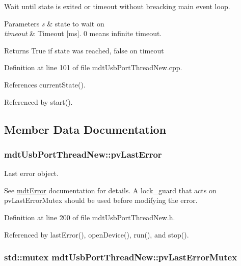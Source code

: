 Wait until state is exited or timeout without breacking main event loop. 


\begin{DoxyParams}{Parameters}
{\em s} & state to wait on \\
\hline
{\em timeout} & Timeout \mbox{[}ms\mbox{]}. 0 means infinite timeout. \\
\hline
\end{DoxyParams}
\begin{DoxyReturn}{Returns}
True if state was reached, false on timeout 
\end{DoxyReturn}


Definition at line 101 of file mdt\-Usb\-Port\-Thread\-New.\-cpp.



References current\-State().



Referenced by start().



\subsection{Member Data Documentation}
\hypertarget{classmdt_usb_port_thread_new_a11cf4aaa691dfad9ae4af28cd1bda893}{
\subsubsection[{pv\-Last\-Error}]{ mdt\-Usb\-Port\-Thread\-New\-::pv\-Last\-Error\hspace{0.3cm}{\ttfamily [protected]}}}\label{classmdt_usb_port_thread_new_a11cf4aaa691dfad9ae4af28cd1bda893}


Last error object. 

See \hyperlink{classmdt_error}{mdt\-Error} documentation for details. A lock\-\_\-guard that acts on pv\-Last\-Error\-Mutex should be used before modifying the error. 

Definition at line 200 of file mdt\-Usb\-Port\-Thread\-New.\-h.



Referenced by last\-Error(), open\-Device(), run(), and stop().

\hypertarget{classmdt_usb_port_thread_new_ab4cc1187ff45331bf873309b26bc9745}{
\subsubsection[{pv\-Last\-Error\-Mutex}]{\setlength{\rightskip}{0pt plus 5cm}std\-::mutex mdt\-Usb\-Port\-Thread\-New\-::pv\-Last\-Error\-Mutex\hspace{0.3cm}{\ttfamily [protected]}}}\label{classmdt_usb_port_thread_new_ab4cc1187ff45331bf873309b26bc9745}


